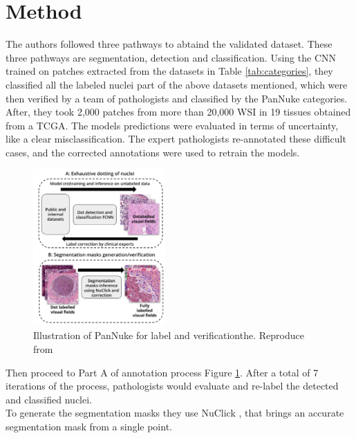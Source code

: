 \documentclass[target=bach,aauheader=,style=]{thud}
\begin{document}
\section{Method}
The authors followed three pathways to abtaind the validated dataset. These three pathways are segmentation, detection and classification. Using the CNN trained on patches extracted from the datasets in Table \ref{tab:categories}, they classified all the labeled nuclei part of the above datasets mentioned, which were then verified by a team of pathologists and classified by the PanNuke categories.\\
After, they took 2,000 patches from more than 20,000 WSI in 19 tissues obtained from a TCGA.
The models predictions were evaluated in terms of uncertainty, like a clear misclassification. The expert pathologists re-annotated these difficult cases, and the corrected annotations were used to retrain the models. 
\begin{figure}[h] %
    \centering
    \includegraphics[width=0.45\textwidth]{imgs/pannuke_annotations.png}
    \caption{Illustration of PanNuke for label and verificationthe. Reproduce from \cite{gamper2020pannuke}}
    \label{fig:process-ver}
\end{figure}
Then proceed to Part A of annotation process Figure \ref{fig:process-ver}. After a total of 7 iterations of the process, pathologists would evaluate and re-label the detected and classified nuclei.\\
To generate the segmentation masks they use NuClick \cite{jahanifar2019nuclick}, that brings an accurate segmentation mask from a single point. 
\end{document}
